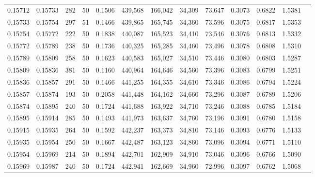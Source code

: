 \begin{tabular}{rrrrrrrrrrrrr}
0.15712 & 0.15733 &   282 &  50 &                                     0.1506 & 439,568 & 166,042 &  34,309 &  73,647 & 0.3073 & 0.6822 & 1.5381 \\
0.15733 & 0.15754 &   297 &  51 &                                     0.1466 & 439,865 & 165,745 &  34,360 &  73,596 & 0.3075 & 0.6817 & 1.5353 \\
0.15754 & 0.15772 &   222 &  50 &                                     0.1838 & 440,087 & 165,523 &  34,410 &  73,546 & 0.3076 & 0.6813 & 1.5332 \\
0.15772 & 0.15789 &   238 &  50 &                                     0.1736 & 440,325 & 165,285 &  34,460 &  73,496 & 0.3078 & 0.6808 & 1.5310 \\
0.15789 & 0.15809 &   258 &  50 &                                     0.1623 & 440,583 & 165,027 &  34,510 &  73,446 & 0.3080 & 0.6803 & 1.5287 \\
0.15809 & 0.15836 &   381 &  50 &                                     0.1160 & 440,964 & 164,646 &  34,560 &  73,396 & 0.3083 & 0.6799 & 1.5251 \\
0.15836 & 0.15857 &   291 &  50 &                                     0.1466 & 441,255 & 164,355 &  34,610 &  73,346 & 0.3086 & 0.6794 & 1.5224 \\
0.15857 & 0.15874 &   193 &  50 &                                     0.2058 & 441,448 & 164,162 &  34,660 &  73,296 & 0.3087 & 0.6789 & 1.5206 \\
0.15874 & 0.15895 &   240 &  50 &                                     0.1724 & 441,688 & 163,922 &  34,710 &  73,246 & 0.3088 & 0.6785 & 1.5184 \\
0.15895 & 0.15914 &   285 &  50 &                                     0.1493 & 441,973 & 163,637 &  34,760 &  73,196 & 0.3091 & 0.6780 & 1.5158 \\
0.15915 & 0.15935 &   264 &  50 &                                     0.1592 & 442,237 & 163,373 &  34,810 &  73,146 & 0.3093 & 0.6776 & 1.5133 \\
0.15935 & 0.15954 &   250 &  50 &                                     0.1667 & 442,487 & 163,123 &  34,860 &  73,096 & 0.3094 & 0.6771 & 1.5110 \\
0.15954 & 0.15969 &   214 &  50 &                                     0.1894 & 442,701 & 162,909 &  34,910 &  73,046 & 0.3096 & 0.6766 & 1.5090 \\
0.15969 & 0.15987 &   240 &  50 &                                     0.1724 & 442,941 & 162,669 &  34,960 &  72,996 & 0.3097 & 0.6762 & 1.5068 \\

\end{tabular}
